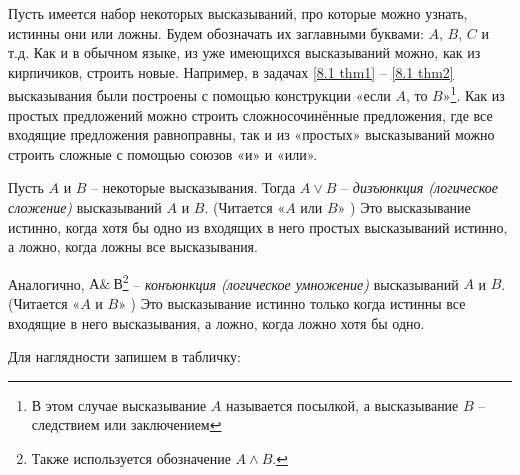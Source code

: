 Пусть имеется набор некоторых высказываний, про которые можно узнать, истинны они или ложны. Будем обозначать их заглавными буквами: $A$, $B$, $C$ и т.д. Как и в обычном языке, из уже имеющихся высказываний можно, как из кирпичиков, строить новые. Например, в задачах \ref{8.1 thm1} – \ref{8.1 thm2} высказывания были построены с помощью конструкции «если $A$, то $B$»\footnote{В этом случае высказывание $A$ называется посылкой, а высказывание $B$ – следствием или заключением}. Как из простых предложений можно строить сложносочинённые предложения, где все входящие предложения равноправны, так и из «простых» высказываний можно строить сложные с помощью союзов «и» и «или».

\begin{dfn}
    Пусть $A$ и $B$ – некоторые высказывания. Тогда $A \vee B$ – \textit{дизъюнкция (логическое сложение)} высказываний $A$ и $B$. (Читается «$A$ или $B$» ) Это высказывание истинно, когда хотя бы одно из входящих в него простых высказываний истинно, а ложно, когда ложны все высказывания.
\end{dfn}

\begin{dfn}
    Аналогично, $А \& \ В$\footnote{Также используется обозначение $A \wedge B$.} – \textit{конъюнкция (логическое умножение)} высказываний $A$ и $B$. (Читается «$A$ и $B$» ) Это высказывание истинно только когда истинны все входящие в него высказывания, а ложно, когда ложно хотя бы одно.
\end{dfn}

Для наглядности запишем в табличку:

